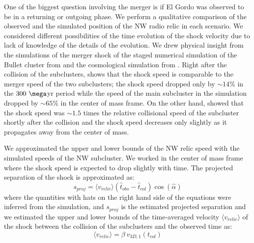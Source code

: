 One of the biggest question involving the merger is if El Gordo was
observed to be in a returning or outgoing phase.
We perform a qualitative comparison of the observed and the
simulated position of the NW radio relic in each scenario.
We considered different possibilities of the time evolution of the shock
velocity due to lack of knowledge of the details of the evolution. We drew physical insight from the simulations of the merger shock of the
staged numerical simulation of the Bullet cluster from \citet{Springel2007}
and the cosmological simulation from \citet{Paul2011b}. Right after
the collision of the subclusters, \citet{Springel2007} shows that the shock speed is
comparable to the merger speed of the two subclusters; the shock speed
dropped only by $\sim 14\%$ in the $300~\mega$yr period while the speed of
the main subcluster in the simulation dropped by $\sim65\%$ in the center
of mass frame. On the other hand, \citet{Paul2011b} showed that the shock
speed was $\sim1.5$ times the relative collisional speed of the subcluster
shortly after the collision and the shock speed decreases only
slightly as it propagates away from the center of mass. \par  
We approximated the upper and lower bounds of the NW relic speed with the
simulated speeds of the NW subcluster.  We worked in the center of mass frame where the shock speed is expected to
drop slightly with time. 
The projected separation of the shock is approximated as:
\begin{equation}
	s_{proj} = \langle v_{relic} \rangle (\hat{t}_{obs} - \hat{t}_{col}) \cos(\hat{\alpha})
	\label{eqn: projectedsep}
\end{equation}
where the quantities with hats on the right hand side of the equations were
inferred from the simulation, and $s_{proj}$ is the estimated projected separation and we estimated the
upper and lower bounds of the time-averaged velocity
$\langle v_{relic} \rangle$ of the shock between
the collision of the subclusters and the observed time as:  
\begin{equation}
	\langle v_{relic} \rangle = \beta~v_{3D,1}(t_{col})  
\end{equation}
